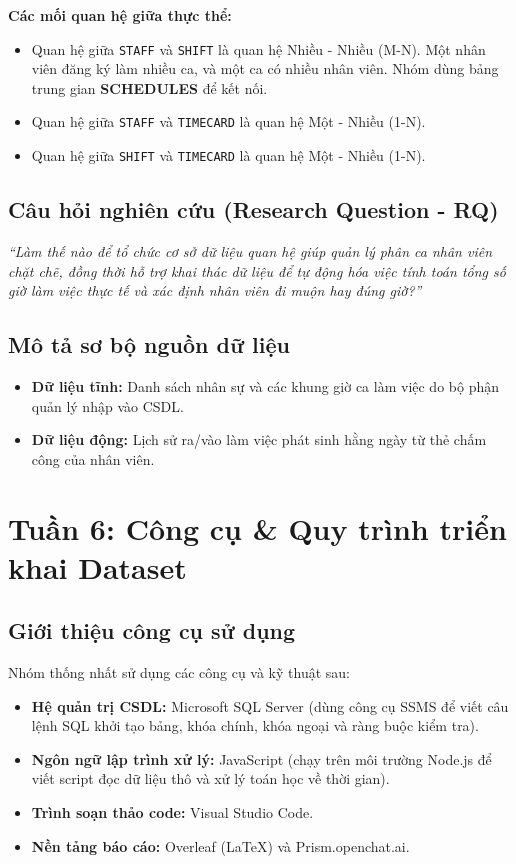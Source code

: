\documentclass[12pt,a4paper]{article}
\begin{document}
\noindent \textbf{Các mối quan hệ giữa thực thể:}
\begin{itemize}
    \item Quan hệ giữa \texttt{STAFF} và \texttt{SHIFT} là quan hệ Nhiều - Nhiều (M-N). Một nhân viên đăng ký làm nhiều ca, và một ca có nhiều nhân viên. Nhóm dùng bảng trung gian \textbf{SCHEDULES} để kết nối.
    \item Quan hệ giữa \texttt{STAFF} và \texttt{TIMECARD} là quan hệ Một - Nhiều (1-N).
    \item Quan hệ giữa \texttt{SHIFT} và \texttt{TIMECARD} là quan hệ Một - Nhiều (1-N).
\end{itemize}

\subsection{Câu hỏi nghiên cứu (Research Question - RQ)}
\textit{“Làm thế nào để tổ chức cơ sở dữ liệu quan hệ giúp quản lý phân ca nhân viên chặt chẽ, đồng thời hỗ trợ khai thác dữ liệu để tự động hóa việc tính toán tổng số giờ làm việc thực tế và xác định nhân viên đi muộn hay đúng giờ?”}

\subsection{Mô tả sơ bộ nguồn dữ liệu}
\begin{itemize}
    \item \textbf{Dữ liệu tĩnh:} Danh sách nhân sự và các khung giờ ca làm việc do bộ phận quản lý nhập vào CSDL.
    \item \textbf{Dữ liệu động:} Lịch sử ra/vào làm việc phát sinh hằng ngày từ thẻ chấm công của nhân viên.
\end{itemize}

\section{Tuần 6: Công cụ \& Quy trình triển khai Dataset}

\subsection{Giới thiệu công cụ sử dụng}
Nhóm thống nhất sử dụng các công cụ và kỹ thuật sau:
\begin{itemize}
    \item \textbf{Hệ quản trị CSDL:} Microsoft SQL Server (dùng công cụ SSMS để viết câu lệnh SQL khởi tạo bảng, khóa chính, khóa ngoại và ràng buộc kiểm tra).
    \item \textbf{Ngôn ngữ lập trình xử lý:} JavaScript (chạy trên môi trường Node.js để viết script đọc dữ liệu thô và xử lý toán học về thời gian).
    \item \textbf{Trình soạn thảo code:} Visual Studio Code.
    \item \textbf{Nền tảng báo cáo:} Overleaf (LaTeX) và Prism.openchat.ai.
\end{itemize}
\end{document}

